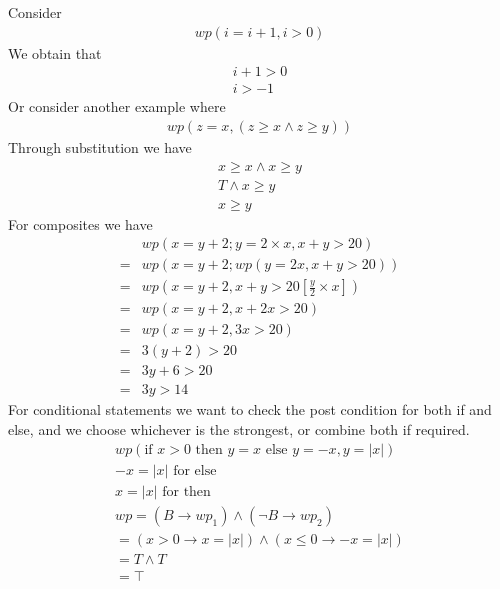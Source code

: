 \documentclass[a4paper]{article}
\theoremstyle{plain}
\theoremstyle{definition}
\newtheorem{exmp}{Example}[section]
\theoremstyle{remark}
\begin{document}
\begin{tcolorbox}[colback=black!3!white,colframe=black!60!white,breakable, enhanced, title=\begin{exmp}Weakest Precondition \label{Weakest Precondition}\end{exmp}]
        Consider
                \begin{align}
                wp(i=i+1, i>0)
                \end{align}
		We obtain that
		\begin{align}
			i+1>0 \\
			i>-1
		\end{align}
		Or consider another example where
		\begin{align}
			wp(z=x, (z \ge x \land z \ge y))
		\end{align}
		Through substitution we have
		\begin{align}
			x \ge x \land x \ge y	 \\
			T \land x \ge y \\
			x \ge y
		\end{align}
		For composites we have
		\begin{align}
			&wp(x = y+2; y= 2 \times x, x+y > 20)\\
			=&wp(x = y+2; wp(y=2x, x+y>20)) \\
			=&wp(x=y+2, x+y > 20 [\frac{y}{2}\times x ]) \\
			=&wp(x=y+2, x+2x > 20)\\
			=&wp(x=y+2, 3x>20) \\
			=& 3(y+2) > 20 \\
			=& 3y + 6 > 20 \\
			=& 3y > 14
		\end{align}
		For conditional statements we want to check the post condition for both if and else, and we choose whichever is the strongest, or combine both if required.
		\begin{align}
			wp(\text{if }x>0 \text{ then } y=x \text{ else } y = -x, y=|x|) \\
			-x = |x| \text{ for else} \\
			x = |x| \text{ for then} \\
			wp = (B \to wp_1) \land (\neg B \to wp_2) \\
			= ( x> 0 \to x = |x| ) \land ( x \le 0 \to  -x = |x|) \\
			= T \land T \\
			= \top
		\end{align}
\end{tcolorbox}
\end{document}
